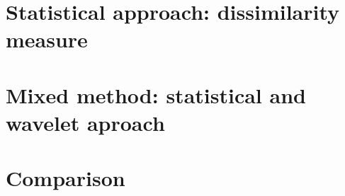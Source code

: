 \documentclass[11pt, oneside]{article}   	%
\begin{document}

\section{Statistical approach: dissimilarity measure}

\section{Mixed method: statistical and wavelet aproach}

\section{Comparison}
\end{document}
